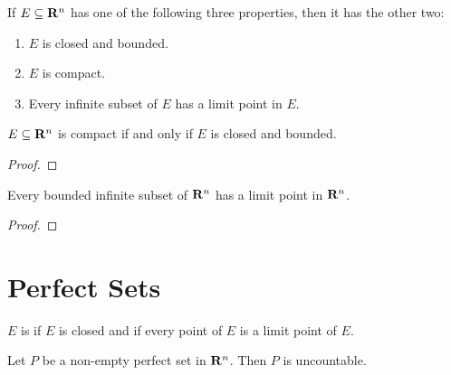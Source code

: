 \begin{proposition}
If $E\subseteq\mathbf R^n$ has one of the following three properties, then it has the other two:
\begin{enumerate}[label=(\arabic*)]
\item $E$ is closed and bounded.
\item $E$ is compact.
\item Every infinite subset of $E$ has a limit point in $E$.
\end{enumerate}
\end{proposition}

\begin{theorem}
$E\subseteq\mathbf R^n$ is compact if and only if $E$ is closed and bounded.
\end{theorem}

\begin{proof}

\end{proof}

\begin{theorem}
Every bounded infinite subset of $\mathbf R^n$ has a limit point in $\mathbf R^n$.
\end{theorem}

\begin{proof}

\end{proof}

\begin{comment}
sequential compactness
A set $K$ is compact if and only if every sequence of points in $K$ has a subsequence that converges to a point in $K$.

Any continuous function defined on a compact set is bounded.

extreme value theorem
\end{comment}
\pagebreak

\section{Perfect Sets}
\begin{definition}
$E$ is  if $E$ is closed and if every point of $E$ is a limit point of $E$.
\end{definition}

\begin{proposition}
Let $P$ be a non-empty perfect set in $\mathbf R^n$. Then $P$ is uncountable.
\end{proposition}

